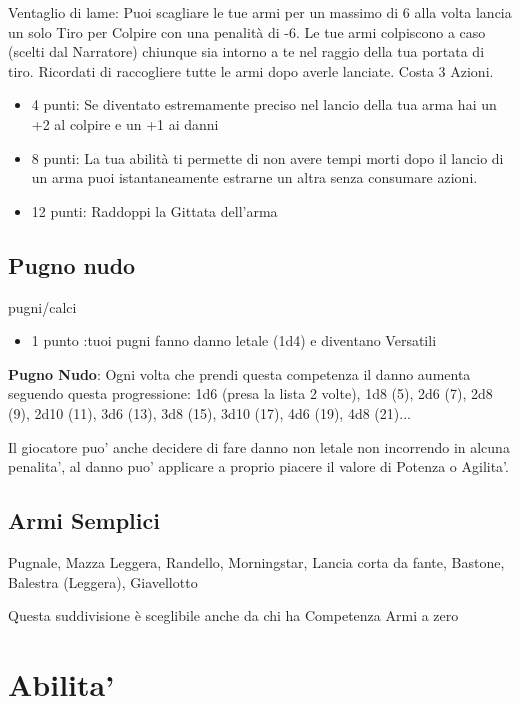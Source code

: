 \documentclass[a4paper,11pt,twoside,openany]{book}
\begin{document}
Ventaglio di lame: Puoi scagliare le tue armi per un massimo di 6 alla volta lancia un solo Tiro per Colpire con una penalità di -6. Le tue armi colpiscono a caso (scelti dal Narratore) chiunque sia intorno a te nel raggio della tua portata di tiro. Ricordati di raccogliere tutte le armi dopo averle lanciate. Costa 3 Azioni.

\begin{itemize}
	\item 4 punti: Se diventato estremamente preciso nel lancio della tua arma hai un +2 al colpire e un +1 ai danni

	\item 8 punti: La tua abilità ti permette di non avere tempi morti dopo il lancio di un arma puoi istantaneamente estrarne un altra senza consumare azioni.

	\item 12 punti: Raddoppi la Gittata dell'arma
\end{itemize}

\subsection{Pugno nudo} pugni/calci

\begin{itemize}
	\item 1 punto :tuoi pugni fanno danno letale (1d4) e diventano Versatili
\end{itemize}

\textbf{Pugno Nudo}: Ogni volta che prendi questa competenza il danno aumenta seguendo questa progressione: 1d6 (presa la lista 2 volte), 1d8 (5), 2d6 (7), 2d8 (9), 2d10 (11), 3d6 (13), 3d8 (15), 3d10 (17), 4d6 (19), 4d8 (21)...

Il giocatore puo' anche decidere di fare danno non letale non incorrendo in alcuna penalita', al danno puo' applicare a proprio piacere il valore di Potenza o Agilita'.

\subsection{Armi Semplici} Pugnale, Mazza Leggera, Randello, Morningstar, Lancia corta da fante, Bastone, Balestra (Leggera), Giavellotto

Questa suddivisione è sceglibile anche da chi ha Competenza Armi a zero

\pagebreak

\section{Abilita'}
\end{document}
